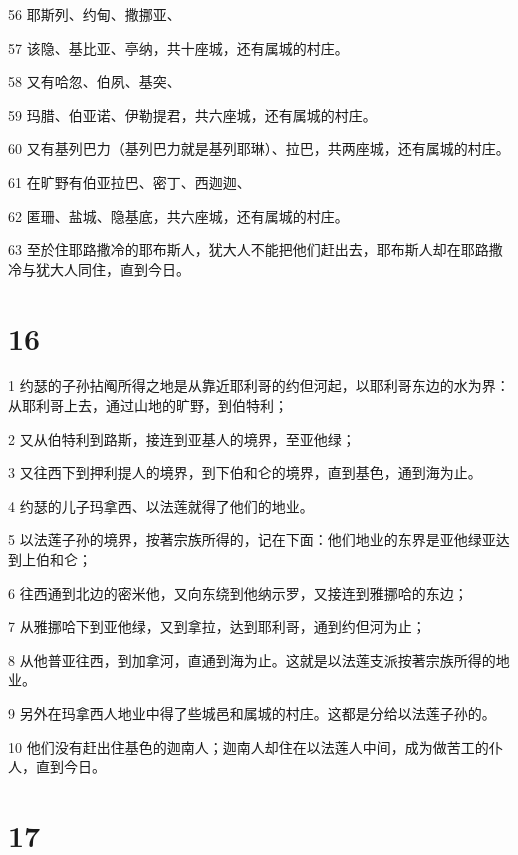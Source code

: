 \par 56 耶斯列、约甸、撒挪亚、
\par 57 该隐、基比亚、亭纳，共十座城，还有属城的村庄。
\par 58 又有哈忽、伯夙、基突、
\par 59 玛腊、伯亚诺、伊勒提君，共六座城，还有属城的村庄。
\par 60 又有基列巴力（基列巴力就是基列耶琳）、拉巴，共两座城，还有属城的村庄。
\par 61 在旷野有伯亚拉巴、密丁、西迦迦、
\par 62 匿珊、盐城、隐基底，共六座城，还有属城的村庄。
\par 63 至於住耶路撒冷的耶布斯人，犹大人不能把他们赶出去，耶布斯人却在耶路撒冷与犹大人同住，直到今日。

\chapter{16}

\par 1 约瑟的子孙拈阄所得之地是从靠近耶利哥的约但河起，以耶利哥东边的水为界：从耶利哥上去，通过山地的旷野，到伯特利；
\par 2 又从伯特利到路斯，接连到亚基人的境界，至亚他绿；
\par 3 又往西下到押利提人的境界，到下伯和仑的境界，直到基色，通到海为止。
\par 4 约瑟的儿子玛拿西、以法莲就得了他们的地业。
\par 5 以法莲子孙的境界，按著宗族所得的，记在下面：他们地业的东界是亚他绿亚达到上伯和仑；
\par 6 往西通到北边的密米他，又向东绕到他纳示罗，又接连到雅挪哈的东边；
\par 7 从雅挪哈下到亚他绿，又到拿拉，达到耶利哥，通到约但河为止；
\par 8 从他普亚往西，到加拿河，直通到海为止。这就是以法莲支派按著宗族所得的地业。
\par 9 另外在玛拿西人地业中得了些城邑和属城的村庄。这都是分给以法莲子孙的。
\par 10 他们没有赶出住基色的迦南人；迦南人却住在以法莲人中间，成为做苦工的仆人，直到今日。

\chapter{17}

